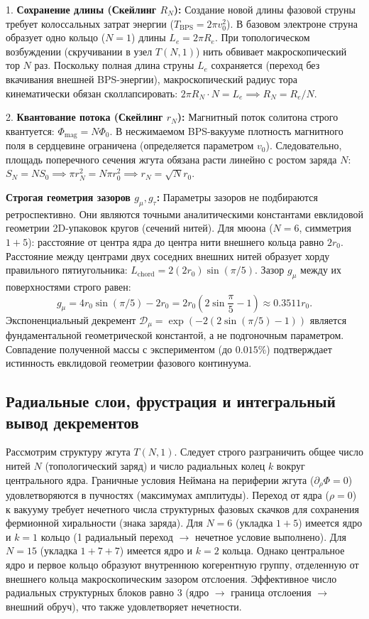 \documentclass[11pt,a4paper]{article}
\begin{document}
1. \textbf{Сохранение длины (Скейлинг $R_N$):} Создание новой длины фазовой струны требует колоссальных затрат энергии ($T_{\text{BPS}} = 2\pi v_0^2$). В базовом электроне струна образует одно кольцо ($N=1$) длины $L_e = 2\pi R_e$. При топологическом возбуждении (скручивании в узел $T(N,1)$) нить обвивает макроскопический тор $N$ раз. Поскольку полная длина струны $L_e$ сохраняется (переход без вкачивания внешней BPS-энергии), макроскопический радиус тора кинематически обязан сколлапсировать: $2\pi R_N \cdot N = L_e \implies R_N = R_e/N$.

2. \textbf{Квантование потока (Скейлинг $r_N$):} Магнитный поток солитона строго квантуется: $\Phi_{\text{mag}} = N \Phi_0$. В несжимаемом BPS-вакууме плотность магнитного поля в сердцевине ограничена (определяется параметром $v_0$). Следовательно, площадь поперечного сечения жгута обязана расти линейно с ростом заряда $N$: $S_N = N S_0 \implies \pi r_N^2 = N \pi r_0^2 \implies r_N = \sqrt{N} r_0$.

\textbf{Строгая геометрия зазоров $g_\mu, g_\tau$:}
Параметры зазоров не подбираются ретроспективно. Они являются точными аналитическими константами евклидовой геометрии 2D-упаковок кругов (сечений нитей).
Для мюона ($N=6$, симметрия $1+5$): расстояние от центра ядра до центра нити внешнего кольца равно $2r_0$. Расстояние между центрами двух соседних внешних нитей образует хорду правильного пятиугольника: $L_{\text{chord}} = 2 (2r_0) \sin(\pi/5)$. Зазор $g_\mu$ между их поверхностями строго равен:
\begin{equation}
g_\mu = 4r_0 \sin(\pi/5) - 2r_0 = 2r_0 \left( 2\sin\frac{\pi}{5} - 1 \right) \approx 0.3511 r_0.
\end{equation}
Экспоненциальный декремент $\mathcal{D}_\mu = \exp(-2(2\sin(\pi/5)-1))$ является фундаментальной геометрической константой, а не подгоночным параметром. Совпадение полученной массы с экспериментом (до $0.015\%$) подтверждает истинность евклидовой геометрии фазового континуума.

\subsection{Радиальные слои, фрустрация и интегральный вывод декрементов}
Рассмотрим структуру жгута $T(N,1)$. Следует строго разграничить общее число нитей $N$ (топологический заряд) и число радиальных колец $k$ вокруг центрального ядра. 
Граничные условия Неймана на периферии жгута ($\partial_\rho \Phi = 0$) удовлетворяются в пучностях (максимумах амплитуды). Переход от ядра ($\rho=0$) к вакууму требует нечетного числа структурных фазовых скачков для сохранения фермионной хиральности (знака заряда).
Для $N=6$ (укладка $1+5$) имеется ядро и $k=1$ кольцо (1 радиальный переход $\to$ нечетное условие выполнено).
Для $N=15$ (укладка $1+7+7$) имеется ядро и $k=2$ кольца. Однако центральное ядро и первое кольцо образуют внутреннюю когерентную группу, отделенную от внешнего кольца макроскопическим зазором отслоения. Эффективное число радиальных структурных блоков равно 3 (ядро $\to$ граница отслоения $\to$ внешний обруч), что также удовлетворяет нечетности.
\end{document}
